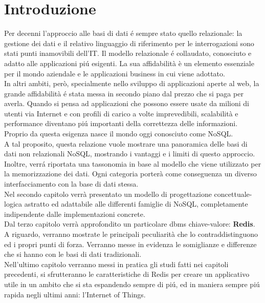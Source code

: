 \chapter*{Introduzione}
Per decenni l'approccio alle basi di dati é sempre stato quello relazionale: la gestione dei dati e il relativo
linguaggio di riferimento per le interrogazioni sono stati punti inamovibili dell'IT.
Il modello relazionale é collaudato, conosciuto e adatto alle applicazioni piú esigenti.
La sua affidabilità è un elemento essenziale per il mondo aziendale e le applicazioni business in cui viene adottato.\\
In altri ambiti, però, specialmente nello sviluppo di applicazioni aperte al web, la grande affidabilità é stata
messa in secondo piano dal prezzo che si paga per averla. Quando si pensa ad applicazioni che possono essere
usate da milioni di utenti via Internet e con profili di carico a volte imprevedibili, scalabilità e performance
diventano piú importanti della correttezza delle informazioni.
Proprio da questa esigenza nasce il mondo oggi conosciuto come NoSQL.\\
A tal proposito, questa relazione vuole mostrare una panoramica delle basi di dati non relazionali NoSQL,
mostrando i vantaggi e i limiti di questo approccio. Inoltre, verrá riportata
una tassonomia in base al modello che viene utilizzato per la memorizzazione dei dati.
Ogni categoria porterà come conseguenza un diverso interfacciamento
con la base di dati stessa.\\
Nel secondo capitolo verrà presentato un modello di progettazione concettuale-logica
astratto ed adattabile alle differenti famiglie di NoSQL, completamente indipendente dalle implementazioni concrete.\\
Dal terzo capitolo verrà approfondito un particolare dbms chiave-valore: \textbf{Redis}.\\
A riguardo, verranno mostrate le principali peculiarità che lo contraddistinguono ed i propri punti di forza.
Verranno messe in evidenza le somiglianze e differenze che si hanno con le basi di dati tradizionali.\\
Nell'ultimo capitolo verranno messi in pratica gli studi fatti nei capitoli precedenti, si sfrutteranno
le caratteristiche di Redis per creare un applicativo utile in un ambito che si sta espandendo sempre di piú, ed in maniera sempre piú rapida
negli ultimi anni: l'Internet of Things.
